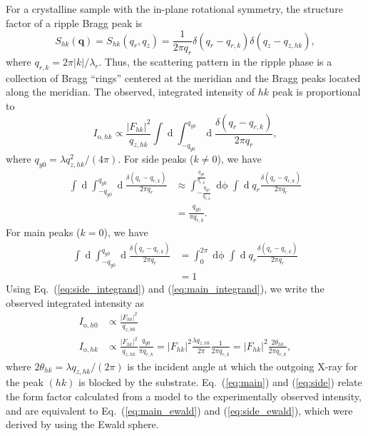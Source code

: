 For a crystalline sample with the in-plane rotational symmetry, the
structure factor of a ripple Bragg peak is  
\begin{equation}
  S_{hk}(\mathbf{q}) = S_{hk}(q_r,q_z) 
  = \frac{1}{2\pi q_r}\delta(q_r-q_{r,k})\delta(q_z-q_{z,hk}),
\end{equation} 
where $q_{r,k}=2\pi |k|/\lambda_r$. Thus, the scattering pattern in the 
ripple phase is a 
collection of Bragg ``rings'' centered at the meridian and the 
Bragg peaks located along the meridian.  
The observed, integrated intensity of $hk$ peak is proportional to
\begin{equation}
  I_{\mathrm{o},hk} 
    \propto \frac{\lvert F_{hk} \rvert^2}{q_{z,hk}} \int\mathop{dq_x} 
            \int_{-q_{y0}}^{q_{y0}}
            \mathop{dq_y} \frac{\delta(q_r-q_{r,k})}{2\pi q_r},
\end{equation}
where $q_{y0} = \lambda q_{z,hk}^2/(4\pi)$.
For side peaks ($k \neq 0$), we have 
\begin{align}
  \int\mathop{dq_x} \int_{-q_{y0}}^{q_{y0}}\mathop{dq_y} \frac{\delta(q_r-q_{r,k})}{2\pi q_r}
  &\approx \int_{-\frac{q_{y0}}{q_{r,k}}}^{\frac{q_{y0}}{q_{r,k}}} \mathop{d\phi} 
          \int \mathop{dq_r} q_r\frac{\delta(q_r-q_{r,k})}{2\pi q_r} \nonumber\\
 &= \frac{q_{y0}}{\pi q_{r,k}}. \label{eq:side_integrand}
\end{align}
For main peaks ($k=0$), we have 
\begin{align}
  \int\mathop{dq_x} \int_{-q_{y0}}^{q_{y0}}\mathop{dq_y} \frac{\delta(q_r-q_{r,k})}{2\pi q_r}
  &= \int_0^{2\pi}\mathop{d\phi} \int\mathop{dq_r} q_r\frac{\delta(q_r-q_{r,k})}{2\pi q_r} \nonumber\\
  &= 1 \label{eq:main_integrand}
\end{align}
Using Eq.~(\ref{eq:side_integrand}) and (\ref{eq:main_integrand}), 
we write the observed integrated intensity as
\begin{align}
  I_{\mathrm{o},h0} &\propto \frac{|F_{h0}|^2}{q_{z,h0}} \label{eq:main}\\
  I_{\mathrm{o},hk} &\propto \frac{|F_{hk}|^2}{q_{z,hk}} \frac{q_{y0}}{\pi q_{r,k}}
    = |F_{hk}|^2 \frac{\lambda q_{z,hk}}{2\pi}\frac{1}{2\pi q_{r,k}}
    = |F_{hk}|^2 \frac{2\theta_{hk}}{2\pi q_{r,k}}, \label{eq:side}
\end{align}
where $2\theta_{hk} = \lambda q_{z,hk}/(2\pi)$ is the incident angle at which 
the outgoing X-ray for the peak $(hk)$ is blocked by the substrate.
Eq.~(\ref{eq:main}) and (\ref{eq:side}) relate the form factor calculated from
a model to the experimentally observed intensity, and are 
equivalent to Eq.~(\ref{eq:main_ewald}) and (\ref{eq:side_ewald}), 
which were derived by using the Ewald sphere. 

